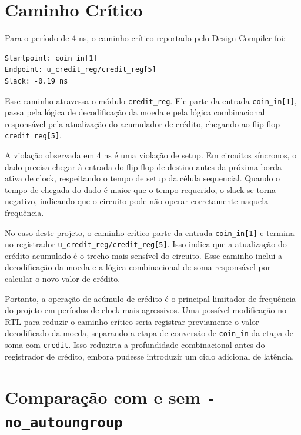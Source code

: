 \documentclass[11pt,a4paper]{article}
\begin{document}
\section{Caminho Crítico}

Para o período de 4 ns, o caminho crítico reportado pelo Design Compiler foi:

\begin{lstlisting}
Startpoint: coin_in[1]
Endpoint: u_credit_reg/credit_reg[5]
Slack: -0.19 ns
\end{lstlisting}

Esse caminho atravessa o módulo \texttt{credit\_reg}. Ele parte da entrada \texttt{coin\_in[1]}, passa pela lógica de decodificação da moeda e pela lógica combinacional responsável pela atualização do acumulador de crédito, chegando ao flip-flop \texttt{credit\_reg[5]}.

A violação observada em 4 ns é uma violação de setup. Em circuitos síncronos, o dado precisa chegar à entrada do flip-flop de destino antes da próxima borda ativa de clock, respeitando o tempo de setup da célula sequencial. Quando o tempo de chegada do dado é maior que o tempo requerido, o slack se torna negativo, indicando que o circuito pode não operar corretamente naquela frequência.

No caso deste projeto, o caminho crítico parte da entrada \texttt{coin\_in[1]} e termina no registrador \texttt{u\_credit\_reg/credit\_reg[5]}. Isso indica que a atualização do crédito acumulado é o trecho mais sensível do circuito. Esse caminho inclui a decodificação da moeda e a lógica combinacional de soma responsável por calcular o novo valor de crédito.

Portanto, a operação de acúmulo de crédito é o principal limitador de frequência do projeto em períodos de clock mais agressivos. Uma possível modificação no RTL para reduzir o caminho crítico seria registrar previamente o valor decodificado da moeda, separando a etapa de conversão de \texttt{coin\_in} da etapa de soma com \texttt{credit}. Isso reduziria a profundidade combinacional antes do registrador de crédito, embora pudesse introduzir um ciclo adicional de latência.

\section{Comparação com e sem \texttt{-no\_autoungroup}}
\end{document}
